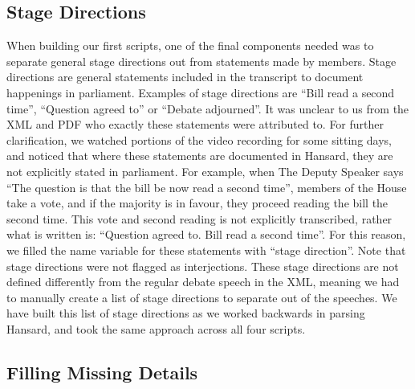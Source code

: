 \documentclass[
  letterpaper,
  DIV=11,
  numbers=noendperiod]{scrartcl}
\begin{document}
\hypertarget{sec-stage}{%
\subsection{Stage Directions}\label{sec-stage}}

When building our first scripts, one of the final components needed was
to separate general stage directions out from statements made by
members. Stage directions are general statements included in the
transcript to document happenings in parliament. Examples of stage
directions are ``Bill read a second time'', ``Question agreed to'' or
``Debate adjourned''. It was unclear to us from the XML and PDF who
exactly these statements were attributed to. For further clarification,
we watched portions of the video recording for some sitting days, and
noticed that where these statements are documented in Hansard, they are
not explicitly stated in parliament. For example, when The Deputy
Speaker says ``The question is that the bill be now read a second
time'', members of the House take a vote, and if the majority is in
favour, they proceed reading the bill the second time. This vote and
second reading is not explicitly transcribed, rather what is written is:
``Question agreed to. Bill read a second time''. For this reason, we
filled the name variable for these statements with ``stage direction''.
Note that stage directions were not flagged as interjections. These
stage directions are not defined differently from the regular debate
speech in the XML, meaning we had to manually create a list of stage
directions to separate out of the speeches. We have built this list of
stage directions as we worked backwards in parsing Hansard, and took the
same approach across all four scripts.

\hypertarget{filling-missing-details}{%
\subsection{Filling Missing Details}\label{filling-missing-details}}
\end{document}
